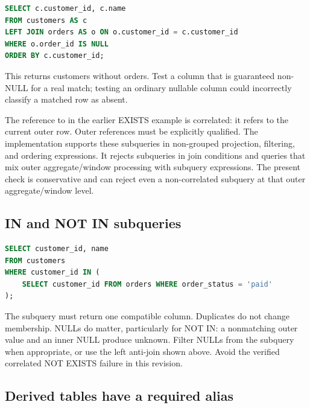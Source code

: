 
\begin{lstlisting}[language=SQL]
SELECT c.customer_id, c.name
FROM customers AS c
LEFT JOIN orders AS o ON o.customer_id = c.customer_id
WHERE o.order_id IS NULL
ORDER BY c.customer_id;
\end{lstlisting}

This returns customers without orders. Test a column that is guaranteed non-NULL for a real match; testing an ordinary nullable column could incorrectly classify a matched row as absent.

The reference to  in the earlier EXISTS example is correlated: it refers to the current outer row. Outer references must be explicitly qualified. The implementation supports these subqueries in non-grouped projection, filtering, and ordering expressions. It rejects subqueries in join conditions and queries that mix outer aggregate/window processing with subquery expressions. The present check is conservative and can reject even a non-correlated subquery at that outer aggregate/window level.

\subsection{IN and NOT IN subqueries}

\begin{lstlisting}[language=SQL]
SELECT customer_id, name
FROM customers
WHERE customer_id IN (
    SELECT customer_id FROM orders WHERE order_status = 'paid'
);
\end{lstlisting}

The subquery must return one compatible column. Duplicates do not change membership. NULLs do matter, particularly for NOT IN: a nonmatching outer value and an inner NULL produce unknown. Filter NULLs from the subquery when appropriate, or use the left anti-join shown above. Avoid the verified correlated NOT EXISTS failure in this revision.

\subsection{Derived tables have a required alias}

